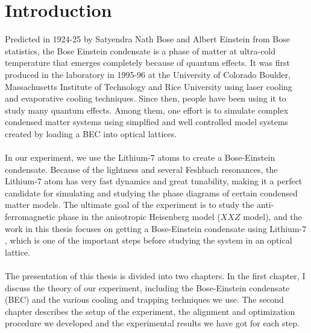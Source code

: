 \chapter{Introduction}

Predicted in 1924-25 by Satyendra Nath Bose and Albert Einstein from Bose statistics, the Bose Einstein condensate is a phase of matter at ultra-cold temperature that emerges completely because of quantum effects. It was first produced in the laboratory in 1995-96 at the University of Colorado Boulder, Massachusetts Institute of Technology and Rice University using laser cooling and evaporative cooling techniques. Since then, people have been using it to study many quantum effects. Among them, one effort is to simulate complex condensed matter systems using simplfied and well controlled model systems created by loading a BEC into optical lattices.\\
\\
In our experiment, we use the Lithium-$7$ atoms to create a Bose-Einstein condensate. Because of the lightness and several Feshbach resonances, the Lithium-$7$ atom has very fast dynamics and great tunability, making it a perfect candidate for simulating and studying the phase diagrams of certain condensed matter models. The ultimate goal of the experiment is to study the anti-ferromagnetic phase in the anisotropic Heisenberg model ($XXZ$ model), and the work in this thesis focuses on getting a Bose-Einstein condensate using Lithium-$7$, which is one of the important steps before studying the system in an optical lattice.\\
\\
The presentation of this thesis is divided into two chapters. In the first chapter, I discuss the theory of our experiment, including the Bose-Einstein condensate (BEC) and the various cooling and trapping techniques we use. The second chapter describes the setup of the experiment, the alignment and optimization procedure we developed and the experimental results we have got for each step.
